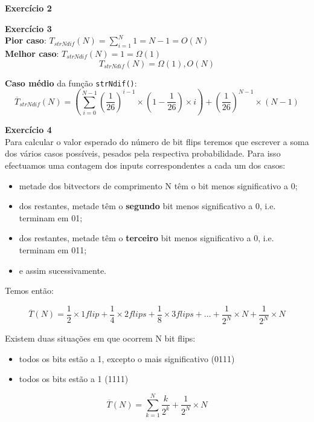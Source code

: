 \documentclass[a4paper,11pt]{article}
\begin{document}
	\newpage
	
	\noindent \textbf{Exercício 2}
	
	\noindent \textbf{Exercício 3}\\
	
	\noindent \textbf{Pior caso}: $ T_{strNdif}(N) = \sum_{i=1}^{N} 1 = N - 1 = O(N) $\\
	
	\noindent \textbf{Melhor caso}: $ T_{strNdif}(N) = 1 = \Omega(1) $\\
	\[
	T_{strNdif}(N) = \Omega(1), O(N)
	\]
	
	\noindent \textbf{Caso médio} da função \texttt{strNdif()}:
	\[
	\overline{T}_{strNdif}(N) = (\sum_{i=0}^{N-1} (\frac{1}{26})^{i-1} \times (1-\frac{1}{26}) \times i) + (\frac{1}{26})^{N-1} \times (N - 1)
	\]
	
	
	\noindent \textbf{Exercício 4}\\
	
	\noindent Para calcular o valor esperado do número de bit flips teremos que escrever a soma dos vários casos possíveis, pesados pela respectiva probabilidade. Para isso efectuamos uma contagem dos inputs correspondentes a cada um dos casos:
	
	\begin{itemize}
		\item metade dos bitvectors de comprimento N têm o bit menos significativo a 0;
		\item dos restantes, metade têm o \textbf{segundo} bit menos significativo a 0, i.e. terminam em 01;
		\item dos restantes, metade têm o \textbf{terceiro} bit menos significativo a 0, i.e. terminam em 011;
		\item e assim sucessivamente.
	\end{itemize}
	
	\noindent Temos então:
	
	\[
		\overline{T}(N) = \frac{1}{2} \times 1 flip + \frac{1}{4} \times 2 flips + \frac{1}{8} \times 3 flips + ... + \frac{1}{2^N} \times N + \frac{1}{2^N} \times N
	\]
	
	\noindent Existem duas situações em que ocorrem N bit flips:
	
	\begin{itemize}
		\item todos os bits estão a 1, excepto o mais significativo (0111)
		\item todos os bits estão a 1 (1111)
	\end{itemize}
	\[
		\overline{T}(N) = \sum_{k=1}^{N} \frac{k}{2^k} + \frac{1}{2^N} \times N
	\]
	
\end{document}
